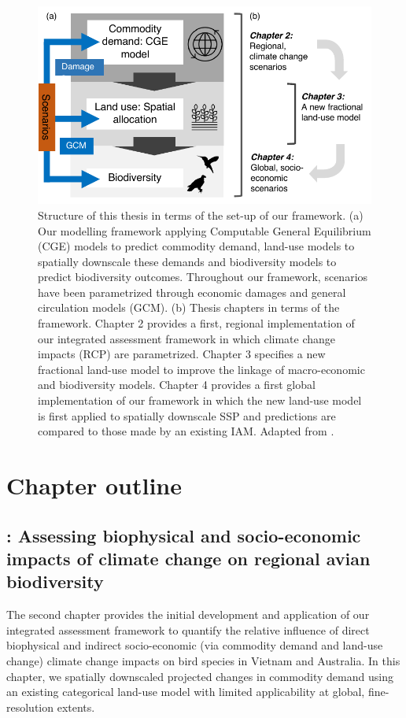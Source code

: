 \documentclass[titlesmallcaps,copyrightpage]{uomthesis}\usepackage[]{graphicx}\usepackage[]{color}
\begin{document}
\begin{figure}[htb]
  \centering
    \includegraphics{chapters/figures/chapter1/fig_structure.pdf}
    \caption{Structure of this thesis in terms of the set-up of our framework. (a) Our modelling framework applying Computable General Equilibrium (CGE) models to predict commodity demand, land-use models to spatially downscale these demands and biodiversity models to predict biodiversity outcomes. Throughout our framework, scenarios have been parametrized through economic damages and general circulation models (GCM). (b) Thesis chapters in terms of the framework. Chapter 2 provides a first, regional implementation of our integrated assessment framework in which climate change impacts (RCP) are parametrized. Chapter 3 specifies a new fractional land-use model to improve the linkage of macro-economic and biodiversity models. Chapter 4 provides a first global implementation of our framework in which the new land-use model is first applied to spatially downscale SSP and predictions are compared to those made by an existing IAM. Adapted from \citet{kapitza_assessing_2021}.}
    \label{ch4:fig_structure}
\end{figure}

\section{Chapter outline}

\subsection*{: Assessing biophysical and socio-economic impacts of climate change on regional avian biodiversity}

The second chapter provides the initial development and application of our integrated assessment framework to quantify the relative influence of direct biophysical and indirect socio-economic (via commodity demand and land-use change) climate change impacts on bird species in Vietnam and Australia. In this chapter, we spatially downscaled projected changes in commodity demand using an existing categorical land-use model with limited applicability at global, fine-resolution extents.
\end{document}
